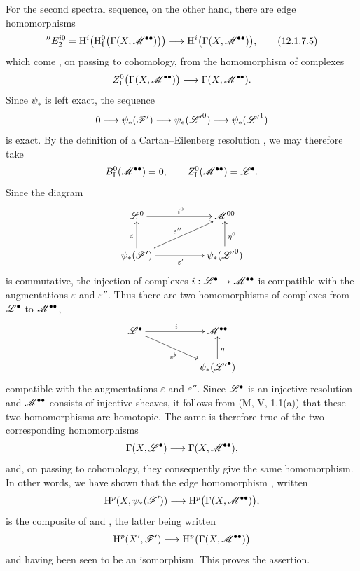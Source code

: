 \begin{env}[12.1.7]
For the second spectral sequence, on the other hand, there are edge
homomorphisms
\[
  {}''E_2^{i0}
  =\mathrm{H}^i\!\left(
      \mathrm{H}_\mathrm{I}^0
        \bigl(\Gamma(X,\mathscr{M}^{\bullet\bullet})\bigr)
    \right)
  \longrightarrow
  \mathrm{H}^i\bigl(\Gamma(X,\mathscr{M}^{\bullet\bullet})\bigr),
  \tag{12.1.7.5}
  \label{0.12.1.7.5}
\]
which come , on passing to cohomology, from the
homomorphism of complexes
\[
  Z_\mathrm{I}^0
    \bigl(\Gamma(X,\mathscr{M}^{\bullet\bullet})\bigr)
  \longrightarrow\Gamma(X,\mathscr{M}^{\bullet\bullet}).
\]
Since $\psi_*$ is left exact, the sequence
\[
  0\longrightarrow\psi_*(\mathscr{F}')
  \longrightarrow\psi_*({\mathscr{L}'}^0)
  \longrightarrow\psi_*({\mathscr{L}'}^1)
\]
is exact.
By the definition of a Cartan--Eilenberg resolution
, we may therefore take
\[
  B_\mathrm{I}^0(\mathscr{M}^{\bullet\bullet})=0,
  \qquad
  Z_\mathrm{I}^0(\mathscr{M}^{\bullet\bullet})=\mathscr{L}^\bullet.
\]
Since the diagram
\[
  \xymatrix@C=50pt@R=24pt{
    \sh{L}^0\ar[r]^{i^0}
      & \sh{M}^{00}\\
    \psi_*(\sh{F}')\ar[u]^\varepsilon
      \ar[r]_{\varepsilon'}\ar[ur]^{\varepsilon''}
      & \psi_*({\sh{L}'}^0)\ar[u]_{\eta^0}
  }
\]
is commutative, the injection of complexes
$i:\mathscr{L}^\bullet\to\mathscr{M}^{\bullet\bullet}$ is compatible with the
augmentations $\varepsilon$ and $\varepsilon''$.
Thus there are two homomorphisms of complexes from $\mathscr{L}^\bullet$
to $\mathscr{M}^{\bullet\bullet}$,
\[
  \xymatrix@C=52pt@R=22pt{
    \sh{L}^\bullet\ar[r]^i\ar[dr]_{v^\flat}
      & \sh{M}^{\bullet\bullet}\\
    & \psi_*({\sh{L}'}^\bullet)\ar[u]_\eta
  }
\]
compatible with the augmentations $\varepsilon$ and
$\varepsilon''$.
Since $\mathscr{L}^\bullet$ is an injective resolution and
$\mathscr{M}^{\bullet\bullet}$ consists of injective sheaves, it follows
from (M, V, 1.1(a)) that these two homomorphisms are homotopic.
The same is therefore true of the two corresponding homomorphisms
\[
  \Gamma(X,\mathscr{L}^\bullet)
  \longrightarrow\Gamma(X,\mathscr{M}^{\bullet\bullet}),
\]
and, on passing to cohomology, they consequently give the same
homomorphism.
In other words, we have shown that the edge homomorphism
, written
\[
  \mathrm{H}^p(X,\psi_*(\mathscr{F}'))
  \longrightarrow\mathrm{H}^p\bigl(\Gamma(X,\mathscr{M}^{\bullet\bullet})\bigr),
\]
is the composite of  and
, the latter being written
\[
  \mathrm{H}^p(X',\mathscr{F}')
  \longrightarrow\mathrm{H}^p\bigl(\Gamma(X,\mathscr{M}^{\bullet\bullet})\bigr)
\]
and having been seen to be an isomorphism.
This proves the assertion.
\end{env}

